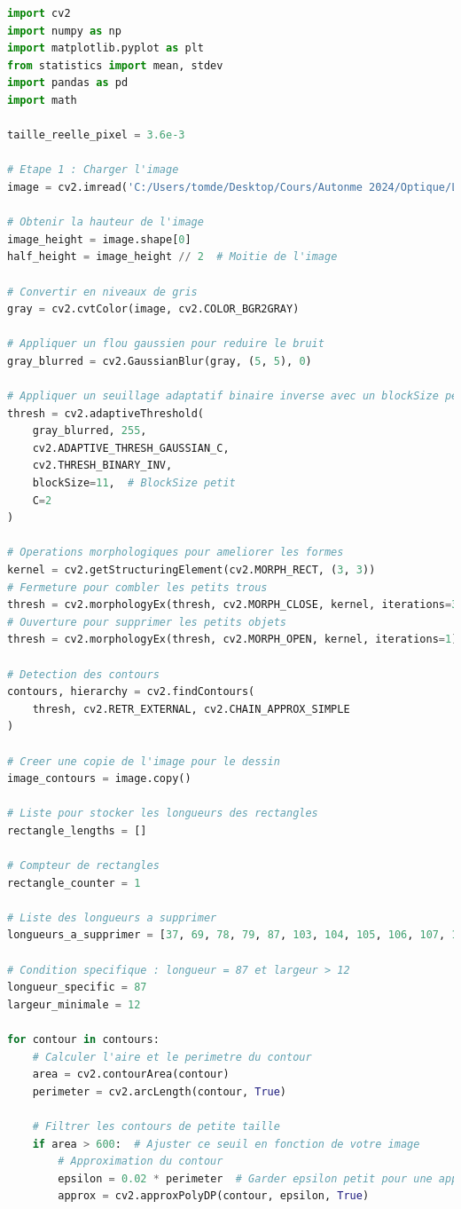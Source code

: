 \documentclass[11pt,letterpaper]{article}
\begin{document}
\begin{lstlisting}[language=python]
import cv2
import numpy as np
import matplotlib.pyplot as plt
from statistics import mean, stdev
import pandas as pd
import math

taille_reelle_pixel = 3.6e-3

# Etape 1 : Charger l'image
image = cv2.imread('C:/Users/tomde/Desktop/Cours/Autonme 2024/Optique/Laboratoire 2/Res/res_1m_min.png')

# Obtenir la hauteur de l'image
image_height = image.shape[0]
half_height = image_height // 2  # Moitie de l'image

# Convertir en niveaux de gris
gray = cv2.cvtColor(image, cv2.COLOR_BGR2GRAY)

# Appliquer un flou gaussien pour reduire le bruit
gray_blurred = cv2.GaussianBlur(gray, (5, 5), 0)

# Appliquer un seuillage adaptatif binaire inverse avec un blockSize petit
thresh = cv2.adaptiveThreshold(
    gray_blurred, 255,
    cv2.ADAPTIVE_THRESH_GAUSSIAN_C,
    cv2.THRESH_BINARY_INV,
    blockSize=11,  # BlockSize petit
    C=2
)

# Operations morphologiques pour ameliorer les formes
kernel = cv2.getStructuringElement(cv2.MORPH_RECT, (3, 3))
# Fermeture pour combler les petits trous
thresh = cv2.morphologyEx(thresh, cv2.MORPH_CLOSE, kernel, iterations=3)
# Ouverture pour supprimer les petits objets
thresh = cv2.morphologyEx(thresh, cv2.MORPH_OPEN, kernel, iterations=1)

# Detection des contours
contours, hierarchy = cv2.findContours(
    thresh, cv2.RETR_EXTERNAL, cv2.CHAIN_APPROX_SIMPLE
)

# Creer une copie de l'image pour le dessin
image_contours = image.copy()

# Liste pour stocker les longueurs des rectangles
rectangle_lengths = []

# Compteur de rectangles
rectangle_counter = 1

# Liste des longueurs a supprimer
longueurs_a_supprimer = [37, 69, 78, 79, 87, 103, 104, 105, 106, 107, 111, 112, 173]

# Condition specifique : longueur = 87 et largeur > 12
longueur_specific = 87
largeur_minimale = 12

for contour in contours:
    # Calculer l'aire et le perimetre du contour
    area = cv2.contourArea(contour)
    perimeter = cv2.arcLength(contour, True)

    # Filtrer les contours de petite taille
    if area > 600:  # Ajuster ce seuil en fonction de votre image
        # Approximation du contour
        epsilon = 0.02 * perimeter  # Garder epsilon petit pour une approximation precise
        approx = cv2.approxPolyDP(contour, epsilon, True)


\end{lstlisting}
\end{document}
